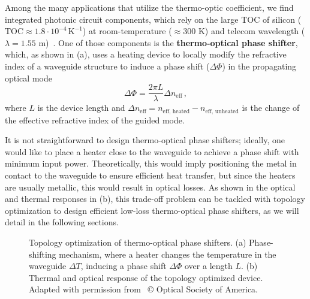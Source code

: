Among the many applications that utilize the thermo-optic coefficient, we find integrated photonic circuit components, which rely on the large 
TOC of silicon ($\text{TOC} \approx 1.8 \cdot 10^{-4}\, \text{K}^{-1}$) at room-temperature ($\approx300$ K) and telecom wavelength 
($\lambda=1.55$ \textmu m)~\cite{thermo-optic-coef}. One of those components is the \textbf{thermo-optical phase shifter}, which, as shown in  (a),
uses a heating device to locally modify the refractive index of a waveguide structure to induce a phase shift ($\Delta \Phi$) in the propagating optical mode
\begin{equation}\label{eq:phase_shift}
\Delta \Phi = \frac{2\pi L}{\lambda} \Delta n_\text{eff}\,,
\end{equation}
where $L$ is the device length and $\Delta n_\text{eff} = n_\text{eff, heated} - n_\text{eff, unheated}$
 is the change of the effective refractive index of the guided mode. 
 
 It is not straightforward to design thermo-optical phase shifters; ideally, one would like to place a heater close to the waveguide to achieve a phase shift with minimum input power.
 Theoretically, this would imply positioning the metal in contact to the waveguide to ensure efficient heat transfer, but since the heaters are usually metallic, this would result
 in optical losses. As shown in the optical and thermal responses in  (b), this trade-off problem can be tackled with topology optimization to design efficient low-loss thermo-optical phase shifters, 
 as we will detail in the following sections.

\begin{figure}[tb]
    \centering
    \caption{Topology optimization of thermo-optical phase shifters. (a) Phase-shifting mechanism, where a heater changes the temperature in the waveguide $\Delta T$, inducing a phase shift
    $\Delta \Phi$ over a length $L$. (b) Thermal and optical response of the topology optimized device. Adapted with permission from~\cite{ownpub0} © Optical Society of America.}
    \label{fig:thermo_res}
\end{figure}


